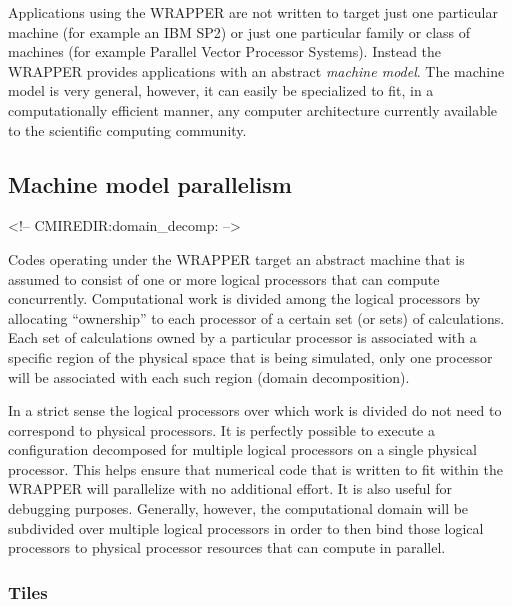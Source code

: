 Applications using the WRAPPER are not written to target just one
particular machine (for example an IBM SP2) or just one particular
family or class of machines (for example Parallel Vector Processor
Systems). Instead the WRAPPER provides applications with an abstract
{\it machine model}. The machine model is very general, however, it
can easily be specialized to fit, in a computationally efficient
manner, any computer architecture currently available to the
scientific computing community.

\subsection{Machine model parallelism}
\label{sect:domain_decomposition}
\begin{rawhtml}
<!-- CMIREDIR:domain_decomp: -->
\end{rawhtml}

Codes operating under the WRAPPER target an abstract machine that is
assumed to consist of one or more logical processors that can compute
concurrently.  Computational work is divided among the logical
processors by allocating ``ownership'' to each processor of a certain
set (or sets) of calculations. Each set of calculations owned by a
particular processor is associated with a specific region of the
physical space that is being simulated, only one processor will be
associated with each such region (domain decomposition).

In a strict sense the logical processors over which work is divided do
not need to correspond to physical processors.  It is perfectly
possible to execute a configuration decomposed for multiple logical
processors on a single physical processor.  This helps ensure that
numerical code that is written to fit within the WRAPPER will
parallelize with no additional effort.  It is also useful for
debugging purposes.  Generally, however, the computational domain will
be subdivided over multiple logical processors in order to then bind
those logical processors to physical processor resources that can
compute in parallel.

\subsubsection{Tiles}

